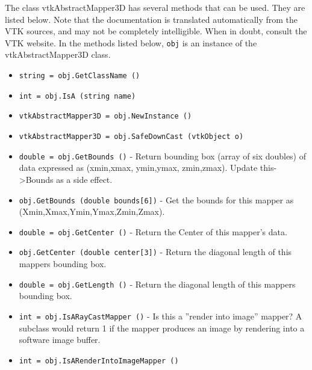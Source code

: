 The class vtkAbstractMapper3D has several methods that can be used.
  They are listed below.
Note that the documentation is translated automatically from the VTK sources,
and may not be completely intelligible.  When in doubt, consult the VTK website.
In the methods listed below, \verb|obj| is an instance of the vtkAbstractMapper3D class.
\begin{itemize}
\item  \verb|string = obj.GetClassName ()|

\item  \verb|int = obj.IsA (string name)|

\item  \verb|vtkAbstractMapper3D = obj.NewInstance ()|

\item  \verb|vtkAbstractMapper3D = obj.SafeDownCast (vtkObject o)|

\item  \verb|double = obj.GetBounds ()| -  Return bounding box (array of six doubles) of data expressed as
 (xmin,xmax, ymin,ymax, zmin,zmax).
 Update this->Bounds as a side effect.

\item  \verb|obj.GetBounds (double bounds[6])| -  Get the bounds for this mapper as (Xmin,Xmax,Ymin,Ymax,Zmin,Zmax).

\item  \verb|double = obj.GetCenter ()| -  Return the Center of this mapper's data.

\item  \verb|obj.GetCenter (double center[3])| -  Return the diagonal length of this mappers bounding box.

\item  \verb|double = obj.GetLength ()| -  Return the diagonal length of this mappers bounding box.

\item  \verb|int = obj.IsARayCastMapper ()| -  Is this a ''render into image'' mapper? A subclass would return 1 if the
 mapper produces an image by rendering into a software image buffer.

\item  \verb|int = obj.IsARenderIntoImageMapper ()|

\end{itemize}
